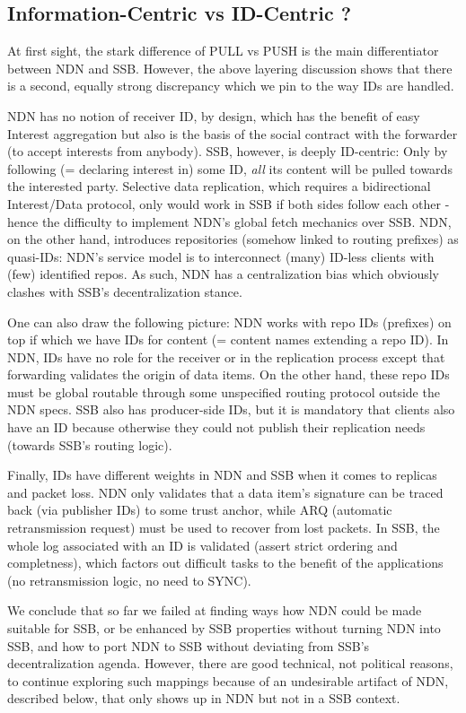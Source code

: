 \documentclass[sigconf]{acmart}
\begin{document}
\subsection{Information-Centric vs ID-Centric ?}

At first sight, the stark difference of PULL vs PUSH is the main
differentiator between NDN and SSB. However, the above layering
discussion shows that there is a second, equally strong discrepancy
which we pin to the way IDs are handled.

NDN has no notion of receiver ID, by design, which has the benefit of
easy Interest aggregation but also is the basis of the social contract
with the forwarder (to accept interests from anybody). SSB, however,
is deeply ID-centric: Only by following (= declaring interest in) some
ID, {\em all} its content will be pulled towards the interested
party. Selective data replication, which requires a bidirectional
Interest/Data protocol, only would work in SSB if both sides follow
each other - hence the difficulty to implement NDN's global fetch
mechanics over SSB. NDN, on the other hand, introduces repositories
(somehow linked to routing prefixes) as quasi-IDs: NDN's service model
is to interconnect (many) ID-less clients with (few) identified repos.
As such, NDN has a centralization bias which obviously clashes with
SSB's decentralization stance.

One can also draw the following picture: NDN works with repo IDs
(prefixes) on top if which we have IDs for content (= content names
extending a repo ID). In NDN, IDs have no role for the receiver or in
the replication process except that forwarding validates the origin of
data items. On the other hand, these repo IDs must be global routable
through some unspecified routing protocol outside the NDN specs. SSB
also has producer-side IDs, but it is mandatory that clients also have
an ID because otherwise they could not publish their replication needs
(towards SSB's routing logic).

Finally, IDs have different weights in NDN and SSB when it comes to
replicas and packet loss. NDN only validates that a data item's
signature can be traced back (via publisher IDs) to some trust anchor,
while ARQ (automatic retransmission request) must be used to recover
from lost packets. In SSB, the whole log associated with an ID is
validated (assert strict ordering and completness), which factors out
difficult tasks to the benefit of the applications (no retransmission
logic, no need to SYNC).

We conclude that so far we failed at finding ways how NDN could be
made suitable for SSB, or be enhanced by SSB properties without
turning NDN into SSB, and how to port NDN to SSB without deviating
from SSB's decentralization agenda. However, there are good technical,
not political reasons, to continue exploring such mappings because of
an undesirable artifact of NDN, described below, that only shows up
in NDN but not in a SSB context.
\end{document}

